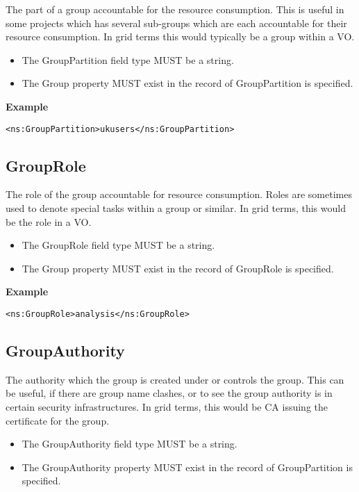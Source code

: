 The part of a group accountable for the resource consumption. This is useful in
some projects which has several sub-groups which are each accountable for their
resource consumption. In grid terms this would typically be a group within a
VO.

\begin{itemize}
\item The GroupPartition field type MUST be a string.
\item The Group property MUST exist in the record of GroupPartition is
    specified.
\end{itemize}

{\bf Example}
\begin{verbatim}
<ns:GroupPartition>ukusers</ns:GroupPartition>
\end{verbatim}


\subsection{GroupRole}

The role of the group accountable for resource consumption. Roles are sometimes
used to denote special tasks within a group or similar. In grid terms, this
would be the role in a VO.

\begin{itemize}
\item The GroupRole field type MUST be a string.
\item The Group property MUST exist in the record of GroupRole is specified.
\end{itemize}

{\bf Example}
\begin{verbatim}
<ns:GroupRole>analysis</ns:GroupRole>
\end{verbatim}


\subsection{GroupAuthority}

The authority which the group is created under or controls the group. This can
be useful, if there are group name clashes, or to see the group authority is in
certain security infrastructures. In grid terms, this would be CA issuing the
certificate for the group.

\begin{itemize}
\item The GroupAuthority field type MUST be a string.
\item The GroupAuthority property MUST exist in the record of GroupPartition
    is specified.
\end{itemize}

